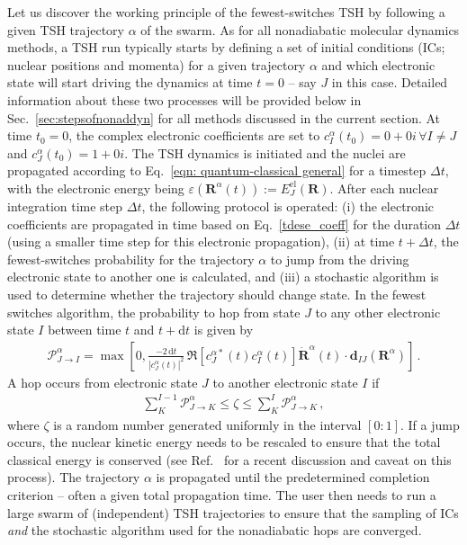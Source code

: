 \documentclass[9pt,bestpractices]{livecoms}
\newcommand{\bs}{\mathbf}
\begin{document}
Let us discover the working principle of the fewest-switches TSH by following a given TSH trajectory $\alpha$ of the swarm. As for all nonadiabatic molecular dynamics methods, a TSH run typically starts by defining a set of initial conditions (ICs; nuclear positions and momenta) for a given trajectory $\alpha$ and which electronic state will start driving the dynamics at time $t=0$ -- say $J$ in this case. Detailed information about these two processes will be provided below in Sec.~\ref{sec:stepsofnonaddyn} for all methods discussed in the current section. At time $t_0=0$, the complex electronic coefficients are set to $c_I^{\alpha}(t_0)=0+0i\, \forall I\neq J$ and $c_J^{\alpha}(t_0)=1+0i$. The TSH dynamics is initiated and the nuclei are propagated according to Eq.~\eqref{eqn: quantum-classical general} for a timestep $\Delta t$, with the electronic energy being $\varepsilon(\bs R^{\alpha}(t)) := E_J^{\text{el}}(\bs R)$. After each nuclear integration time step $\Delta t$, the following protocol is operated: (i) the electronic coefficients are propagated in time based on Eq.~\eqref{tdese_coeff} for the duration $\Delta t$ (using a smaller time step for this electronic propagation), (ii) at time $t+\Delta t$, the fewest-switches probability for the trajectory $\alpha$ to jump from the driving electronic state to another one is calculated, and (iii) a stochastic algorithm is used to determine whether the trajectory should change state. In the fewest switches algorithm,\cite{tully90} the probability to hop from state $J$ to any other electronic state $I$ between time $t$ and $t+\text{d}t$ is given by
\begin{align}
\mathcal P_{J\rightarrow I}^{\alpha} = \max\left[0, \frac{-2 \,\mathrm{d}t}{\left|c_J^{\alpha}(t)\right|^2} \,\Re\left[c_J^{\alpha \ast}(t)c_I^{\alpha}(t)\right] \dot{\bs R}^{\alpha}(t)\cdot \bs d_{IJ}\left(\bs R^{\alpha}\right)\right] \, .
\label{eq:tshproba}
\end{align}
A hop occurs from electronic state $J$ to another electronic state $I$ if
\begin{align}
\sum_K^{I-1} \mathcal P_{J\rightarrow K}^{\alpha} \le \zeta \le \sum_K^{I} \mathcal P_{J\rightarrow K}^{\alpha} \, ,
\end{align}
where $\zeta$ is a random number generated uniformly in the interval $[0:1]$. If a jump occurs, the nuclear kinetic energy needs to be rescaled to ensure that the total classical energy is conserved (see Ref.~ for a recent discussion and caveat on this process). The trajectory $\alpha$ is propagated until the predetermined completion criterion -- often a given total propagation time. The user then needs to run a large swarm of (independent) TSH trajectories to ensure that the sampling of ICs \textit{and} the stochastic algorithm used for the nonadiabatic hops are converged.  
\end{document}

